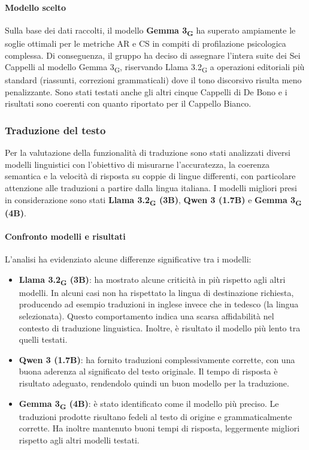 \documentclass[11pt,a4paper]{article}
\newcommand{\gls}[1]{#1\textsubscript{G}}
\begin{document}
\paragraph{Modello scelto}
Sulla base dei dati raccolti, il modello \textbf{\gls{Gemma 3}} ha superato ampiamente le soglie ottimali per le metriche AR e CS in compiti di profilazione psicologica complessa. Di conseguenza, il gruppo ha deciso di assegnare l'intera suite dei Sei Cappelli al modello \gls{Gemma 3}, riservando \gls{Llama 3.2} a operazioni editoriali più standard (riassunti, correzioni grammaticali) dove il tono discorsivo risulta meno penalizzante. Sono stati testati anche gli altri cinque Cappelli di De Bono e i risultati sono coerenti con quanto riportato per il Cappello Bianco.

\subsubsection{Traduzione del testo}
Per la valutazione della funzionalità di traduzione sono stati analizzati diversi modelli linguistici con l’obiettivo di misurarne l’accuratezza, la coerenza semantica e la velocità di risposta su coppie di lingue differenti, con particolare attenzione alle traduzioni a partire dalla lingua italiana. I modelli migliori presi in considerazione sono stati \textbf{\gls{Llama 3.2} (3B)}, \textbf{Qwen 3 (1.7B)} e \textbf{\gls{Gemma 3} (4B)}.

\paragraph{Confronto modelli e risultati}
L’analisi ha evidenziato alcune differenze significative tra i modelli:

\begin{itemize}
    \item \textbf{\gls{Llama 3.2} (3B)}: ha mostrato alcune criticità in più rispetto agli altri modelli. In alcuni casi non ha rispettato la lingua di destinazione richiesta, producendo ad esempio traduzioni in inglese invece che in tedesco (la lingua selezionata). Questo comportamento indica una scarsa affidabilità nel contesto di traduzione linguistica. Inoltre, è risultato il modello più lento tra quelli testati.
    \item \textbf{Qwen 3 (1.7B)}: ha fornito traduzioni complessivamente corrette, con una buona aderenza al significato del testo originale. Il tempo di risposta è risultato adeguato, rendendolo quindi un buon modello per la traduzione.
    \item \textbf{\gls{Gemma 3} (4B)}: è stato identificato come il modello più preciso. Le traduzioni prodotte risultano fedeli al testo di origine e grammaticalmente corrette. Ha inoltre mantenuto buoni tempi di risposta, leggermente migliori rispetto agli altri modelli testati.
\end{itemize}
\end{document}
